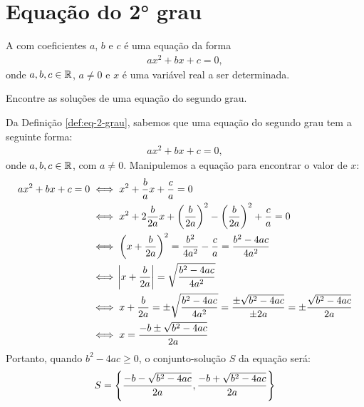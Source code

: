 \section{Equação do 2° grau}

\begin{definition}
\label{def:eq-2-grau}
A  com coeficientes $a$, $b$ e $c$ é uma equação da forma 
%
\begin{align*}
ax^2 + bx + c = 0,
\end{align*}
%
\noindent onde $a, b, c \in \mathbb{R}$, $a \neq 0$ e $x$ é uma variável real a ser determinada.
\end{definition}

\begin{example}
\label{ex:sol-2-grau}
Encontre as soluções de uma equação do segundo grau.
\end{example}

\begin{solution}
Da Definição \ref{def:eq-2-grau}, sabemos que uma equação do segundo grau tem a seguinte forma:
%
\begin{align*}
	ax^2 + bx + c = 0,
\end{align*}
%
onde $a,b,c \in \mathbb{R}$, com $a \ne 0$. Manipulemos a equação para encontrar o valor de $x$:
%
\begin{align*}
ax^2 + bx + c = 0 & \iff x^2+\frac{b}{a}x +\frac{c}{a}=0 \\ 
	& \iff x^2+2\frac{b}{2a}x+\left(\frac{b}{2a}\right)^2-\left(\frac{b}{2a}\right)^2+\frac{c}{a}=0\\ 
	& \iff \left(x+\frac{b}{2a}\right)^2=\frac{b^2}{4a^2}-\frac{c}{a}=\frac{b^2 -4ac}{4a^2}\\ 
	& \iff \abs{x+\frac{b}{2a}} = \sqrt{\frac{b^2-4ac}{4a^2}}\\ 
	& \iff x+\frac{b}{2a}=\pm\sqrt{\frac{b^2-4ac}{4a^2}}=\frac{\pm\sqrt{b^2-4ac}}{\pm2a}=\pm\frac{\sqrt{b^2-4ac}}{2a}\\ 
	& \iff x=\frac{-b\pm\sqrt{b^2-4ac}}{2a}\\ 
\end{align*}
%	
Portanto, quando $b^2-4ac \ge 0$, o conjunto-solução $S$ da equação será:
%
\begin{align*}
 S = \left\{ \dfrac{-b-\sqrt{b^2-4ac}}{2a}, \dfrac{-b+\sqrt{b^2-4ac}}{2a}\right\}
\end{align*}
\end{solution}

\begin{onlineact}
\end{onlineact}

